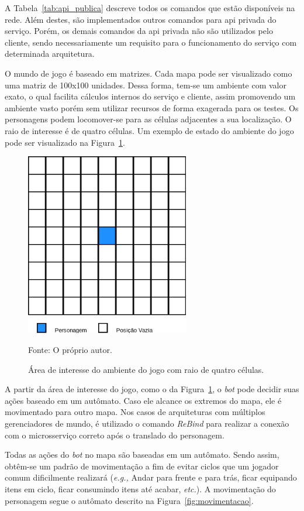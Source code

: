 A Tabela~\ref{tab:api_publica} descreve todos os comandos que estão disponíveis na rede.
%
Além destes, são implementados outros comandos para \ac{api} privada do serviço.
%
Porém, os demais comandos da \ac{api} privada não são utilizados pelo cliente, sendo necessariamente um requisito para o funcionamento do serviço com determinada arquitetura.


O mundo de jogo é baseado em matrizes.
%
Cada mapa pode ser visualizado como uma matriz de 100x100 unidades.
%
Dessa forma, tem-se um ambiente com valor exato, o qual facilita cálculos internos do serviço e cliente, assim promovendo um ambiente vasto porém sem utilizar recursos de forma exagerada para os testes.
%
Os personagens podem locomover-se para as células adjacentes a sua localização.
%
O raio de interesse é de quatro células.
%
Um exemplo de estado do ambiente do jogo pode ser visualizado na Figura~\ref{fig:roi}.

\begin{figure}[htb!]
  \caption{Área de interesse do ambiente do jogo com raio de quatro células.}
  \label{fig:roi}
  \includegraphics[height=8.0cm]{img/cap3/roi.png}
  \centering

  Fonte: O próprio autor.
\end{figure}

A partir da área de interesse do jogo, como o da Figura~\ref{fig:roi}, o \textit{bot} pode decidir suas ações baseado em um autômato.
%
Caso ele alcance os extremos do mapa, ele é
 movimentado para outro mapa.
%
Nos casos de arquiteturas com múltiplos gerenciadores de mundo, é utilizado o comando \textit{ReBind} para realizar a conexão com o microsserviço correto após o translado do personagem.



Todas as ações do \textit{bot} no mapa são baseadas em um autômato.
%
Sendo assim, obtêm-se um padrão de movimentação a fim de evitar ciclos que um jogador comum dificilmente realizará (\textit{e.g.,} Andar para frente e para trás, ficar equipando itens em ciclo, ficar consumindo itens até acabar, \textit{etc.}).
%
A movimentação do personagem segue o autômato descrito na Figura~\ref{fig:movimentacao}.


